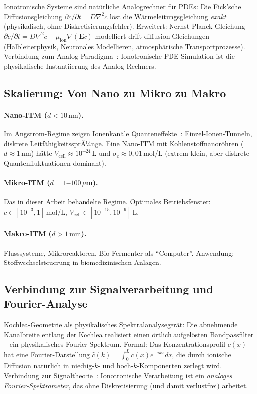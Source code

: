 ﻿\documentclass[a4paper,12pt]{article}
\theoremstyle{plain}
\theoremstyle{definition}
\theoremstyle{remark}
\begin{document}
Ionotronische Systeme sind nat\"urliche Analogrechner f\"ur PDEs:
Die Fick'sche Diffusionsgleichung $\partial c/\partial t = D\nabla^2 c$
l\"ost die W\"armeleitungsgleichung \emph{exakt} (physikalisch, ohne Diskretisierungsfehler).
Erweitert: Nernst-Planck-Gleichung
$\partial c/\partial t = D\nabla^2 c - \mu_{\mathrm{ion}} \nabla(\mathbf{E}c)$
modelliert drift-diffusion-Gleichungen (Halbleiterphysik, Neuronales Modellieren,
atmosph\"arische Transportprozesse).
Verbindung zum Analog-Paradigma~\cite{epp2026analog}: Ionotronische
PDE-Simulation ist die physikalische Instantiierung des Analog-Rechners.

\subsection{Skalierung: Von Nano zu Mikro zu Makro}

\paragraph{Nano-ITM ($d < 10\,\text{nm}$).}
Im Angstrom-Regime zeigen Ionenkan\"ale Quanteneffekte~\cite{bocquet2020}:
Einzel-Ionen-Tunneln, diskrete Leitf\"ahigkeitssprÃ¼nge.
Eine Nano-ITM mit Kohlenstoffnanor\"ohren ($d \approx 1\,\text{nm}$) h\"atte
$V_{\mathrm{cell}} \approx 10^{-24}\,$L und $\sigma_c \approx 0{,}01\,$mol/L
(extrem klein, aber diskrete Quantenfluktuationen dominant).

\paragraph{Mikro-ITM ($d = 1$--$100\,\mu$m).}
Das in dieser Arbeit behandelte Regime.
Optimales Betriebsfenster: $c \in [10^{-3}, 1]\,\text{mol/L}$,
$V_{\mathrm{cell}} \in [10^{-15}, 10^{-9}]\,\text{L}$.

\paragraph{Makro-ITM ($d > 1\,\text{mm}$).}
Flusssysteme, Mikroreaktoren, Bio-Fermenter als ``Computer''.
Anwendung: Stoffwechselsteuerung in biomedizinischen Anlagen.

\subsection{Verbindung zur Signalverarbeitung und Fourier-Analyse}

Kochlea-Geometrie als physikalisches Spektralanalyseger\"at:
Die abnehmende Kanalbreite entlang der Kochlea realisiert einen
\"ortlich aufgel\"osten Bandpassfilter -- ein physikalisches Fourier-Spektrum.
Formal: Das Konzentrationsprofil $c(x)$ hat eine Fourier-Darstellung
$\hat{c}(k) = \int_0^L c(x) e^{-ikx} dx$, die durch ionische Diffusion
nat\"urlich in niedrig-$k$- und hoch-$k$-Komponenten zerlegt wird.
Verbindung zur Signaltheorie~\cite{epp2026signalth}:
Ionotronische Verarbeitung ist ein \emph{analoges Fourier-Spektrometer},
das ohne Diskretisierung (und damit verlustfrei) arbeitet.
\end{document}
